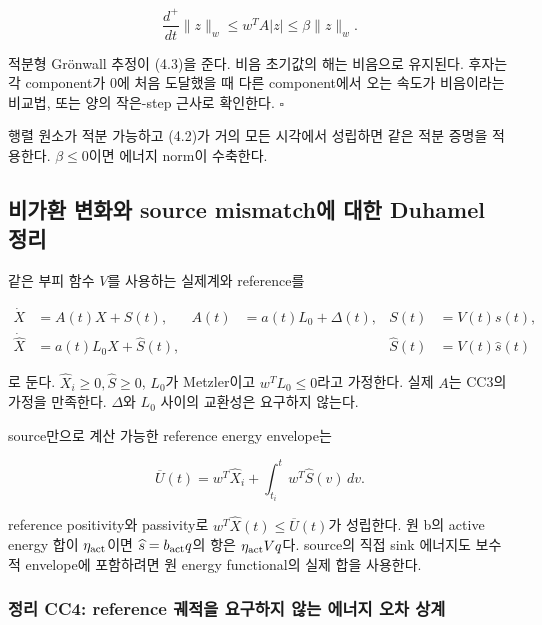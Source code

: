 \documentclass[11pt,a4paper]{article}
\begin{document}
\[
\frac{d^+}{dt}\|z\|_w
\le w^TA|z|\le\beta\|z\|_w.
\]

적분형 Grönwall 추정이 (4.3)을 준다. 비음 초기값의 해는 비음으로 유지된다. 후자는 각 component가 0에 처음 도달했을 때 다른 component에서 오는 속도가 비음이라는 비교법, 또는 양의 작은-step 근사로 확인한다. \(\square\)

행렬 원소가 적분 가능하고 (4.2)가 거의 모든 시각에서 성립하면 같은 적분 증명을 적용한다. \(\beta\le0\)이면 에너지 norm이 수축한다.

\hypertarget{uxbe44uxac00uxd658-uxbcc0uxd654uxc640-source-mismatchuxc5d0-uxb300uxd55c-duhamel-uxc815uxb9ac}{%
\subsection{비가환 변화와 source mismatch에 대한 Duhamel 정리}\label{uxbe44uxac00uxd658-uxbcc0uxd654uxc640-source-mismatchuxc5d0-uxb300uxd55c-duhamel-uxc815uxb9ac}}

같은 부피 함수 \(V\)를 사용하는 실제계와 reference를

\[
\begin{aligned}
\dot X&=A(t)X+S(t),&
A(t)&=a(t)L_0+\Delta(t),&
S(t)&=V(t)s(t),\\
\dot{\widehat X}&=a(t)L_0\widehat X+\widehat S(t),&&&
\widehat S(t)&=V(t)\widehat s(t)
\end{aligned}
\tag{5.1}
\]

로 둔다. \(\widehat X_i\ge0,\widehat S\ge0\), \(L_0\)가 Metzler이고 \(w^TL_0\le0\)라고 가정한다. 실제 \(A\)는 CC3의 가정을 만족한다. \(\Delta\)와 \(L_0\) 사이의 교환성은 요구하지 않는다.

source만으로 계산 가능한 reference energy envelope는

\[
\boxed{
\overline U(t)=w^T\widehat X_i+
\int_{t_i}^{t}w^T\widehat S(v)\,dv.
}
\tag{5.2}
\]

reference positivity와 passivity로 \(w^T\widehat X(t)\le\overline U(t)\)가 성립한다. 원 b의 active energy 합이 \(\eta_{\rm act}\)이면 \(\widehat s=b_{\rm act}q\)의 항은 \(\eta_{\rm act}Vq\)다. source의 직접 sink 에너지도 보수적 envelope에 포함하려면 원 energy functional의 실제 합을 사용한다.

\hypertarget{uxc815uxb9ac-cc4-reference-uxada4uxc801uxc744-uxc694uxad6cuxd558uxc9c0-uxc54auxb294-uxc5d0uxb108uxc9c0-uxc624uxcc28-uxc0c1uxacc4}{%
\subsubsection{정리 CC4: reference 궤적을 요구하지 않는 에너지 오차 상계}\label{uxc815uxb9ac-cc4-reference-uxada4uxc801uxc744-uxc694uxad6cuxd558uxc9c0-uxc54auxb294-uxc5d0uxb108uxc9c0-uxc624uxcc28-uxc0c1uxacc4}}
\end{document}
